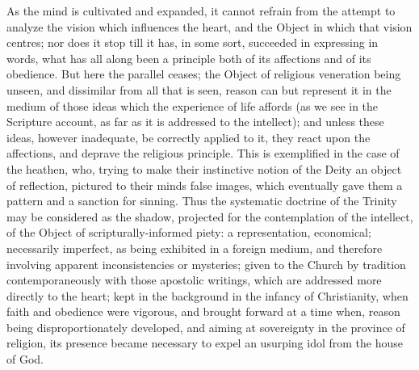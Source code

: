 As the mind is cultivated and expanded, it cannot refrain from the
attempt to analyze the vision which influences the heart, and the
Object in which that vision centres; nor does it stop till it has, in
some sort, succeeded in expressing in words, what has all along been a
principle both of its affections and of its obedience. But here the
parallel ceases; the Object of religious veneration being unseen, and
dissimilar from all that is seen, reason can but represent it in the
medium of those ideas which the experience of life affords (as we see
in the Scripture account, as far as it is addressed to the intellect);
and unless these ideas, however inadequate, be correctly applied to
it, they react upon the affections, and deprave the religious
principle. This is exemplified in the case of the heathen, who, trying
to make their instinctive notion of the Deity an object of reflection,
pictured to their minds false images, which eventually gave them a
pattern and a sanction for sinning. Thus the systematic doctrine of
the Trinity may be considered as the shadow, projected for the
contemplation of the intellect, of the Object of scripturally-informed
piety: a representation, economical; necessarily imperfect, as being
exhibited in a foreign medium, and therefore involving apparent
inconsistencies or mysteries; given to the Church by tradition
contemporaneously with those apostolic writings, which are addressed
more directly to the heart; kept in the background in the infancy of
Christianity, when faith and obedience were vigorous, and brought
forward at a time when, reason being disproportionately developed, and
aiming at sovereignty in the province of religion, its presence became
necessary to expel an usurping idol from the house of God.

